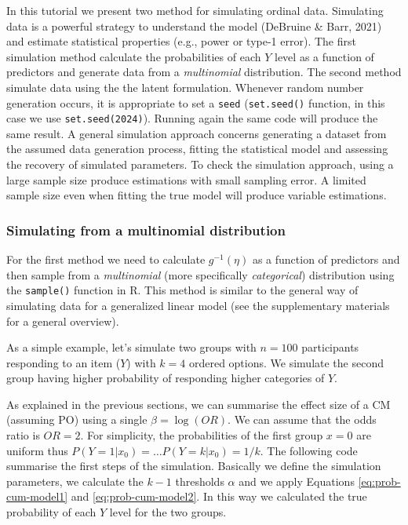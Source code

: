 \documentclass[
  man, mask,floatsintext]{apa6}
\begin{document}
In this tutorial we present two method for simulating ordinal data. Simulating data is a powerful strategy to understand the model (DeBruine \& Barr, 2021) and estimate statistical properties (e.g., power or type-1 error). The first simulation method calculate the probabilities of each \(Y\) level as a function of predictors and generate data from a \emph{multinomial} distribution. The second method simulate data using the the latent formulation. Whenever random number generation occurs, it is appropriate to set a \texttt{seed} (\texttt{set.seed()} function, in this case we use \texttt{set.seed(2024)}). Running again the same code will produce the same result. A general simulation approach concerns generating a dataset from the assumed data generation process, fitting the statistical model and assessing the recovery of simulated parameters. To check the simulation approach, using a large sample size produce estimations with small sampling error. A limited sample size even when fitting the true model will produce variable estimations.

\subsubsection{Simulating from a multinomial distribution}\label{simulating-from-a-multinomial-distribution}

For the first method we need to calculate \(g^{-1}(\eta)\) as a function of predictors and then sample from a \emph{multinomial} (more specifically \emph{categorical}) distribution using the \texttt{sample()} function in R. This method is similar to the general way of simulating data for a generalized linear model (see the supplementary materials for a general overview).

As a simple example, let's simulate two groups with \(n = 100\) participants responding to an item (\(Y\)) with \(k = 4\) ordered options. We simulate the second group having higher probability of responding higher categories of \(Y\).

As explained in the previous sections, we can summarise the effect size of a CM (assuming PO) using a single \(\beta = \log(OR)\). We can assume that the odds ratio is \(OR = 2\). For simplicity, the probabilities of the first group \(x = 0\) are uniform thus \(P(Y = 1|x_0) = \dots P(Y = k|x_0) = 1/k\). The following code summarise the first steps of the simulation. Basically we define the simulation parameters, we calculate the \(k - 1\) thresholds \(\alpha\) and we apply Equations \eqref{eq:prob-cum-model1} and \eqref{eq:prob-cum-model2}. In this way we calculated the true probability of each \(Y\) level for the two groups.
\end{document}
